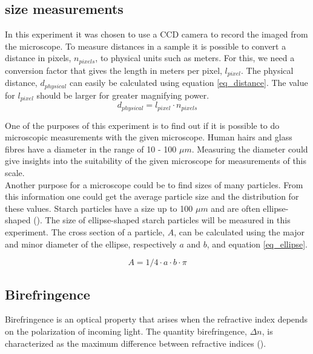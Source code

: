 \subsection{size measurements}
In this experiment it was chosen to use a CCD camera to record the imaged from the microscope. To measure distances in a sample it is possible to convert a distance in pixels, $n_{pixels}$, to physical units such as meters. For this, we need a conversion factor that gives the length in meters per pixel, $l_{pixel}$. The physical distance, $d_{physical}$ can easily be calculated using equation \ref{eq_distance}.
The value for $l_{pixel}$ should be larger for greater magnifying power.\\

\begin{equation}
	\label{eq_distance}
	d_{physical} = l_{pixel} \cdot n_{pixels}
\end{equation}

\bigskip
\vspace{5mm}

One of the purposes of this experiment is to find out if it is possible to do microscopic measurements with the given microscope. Human hairs and glass fibres have a diameter in the range of 10 - 100 $\mu m$. Measuring the diameter could give insights into the suitability of the given microscope for measurements of this scale.\\
Another purpose for a microscope could be to find sizes of many particles. From this information one could get the average particle size and the distribution for these values. Starch particles have a size up to 100 $\mu m$ and are often ellipse-shaped (\cite{starch}). The size of ellipse-shaped starch particles will be measured in this experiment. The cross section of a particle, $A$, can be calculated using the major and minor diameter of the ellipse, respectively $a$ and $b$, and equation \ref{eq_ellipse}.

\begin{equation}
	\label{eq_ellipse}
	A = 1/4 \cdot a \cdot b \cdot \pi
\end{equation}
\clearpage

\subsection{Birefringence}

Birefringence is an optical property that arises when the refractive index depends on the polarization of incoming light. The quantity birefringence, $\Delta n$, is characterized as the maximum difference between refractive indices (\cite{hecht}). \\

